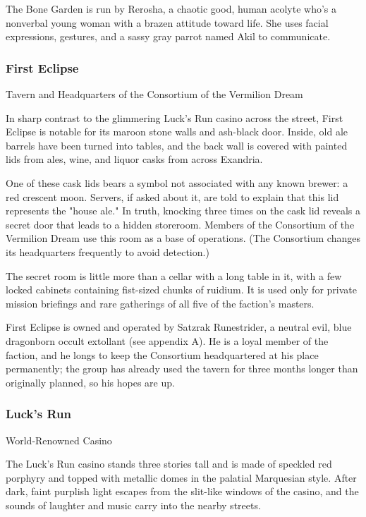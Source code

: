 \documentclass[10pt,a4paper,twoside,twocolumn,openany,nodeprecatedcode]{dndbook}
\begin{document}
The Bone Garden is run by Rerosha, a chaotic good, human acolyte who's a nonverbal young woman with a brazen attitude toward life. She uses facial expressions, gestures, and a sassy gray parrot named Akil to communicate.

\subsubsection{First Eclipse}
Tavern and Headquarters of the Consortium of the Vermilion Dream

In sharp contrast to the glimmering Luck's Run casino across the street, First Eclipse is notable for its maroon stone walls and ash-black door. Inside, old ale barrels have been turned into tables, and the back wall is covered with painted lids from ales, wine, and liquor casks from across Exandria.

One of these cask lids bears a symbol not associated with any known brewer: a red crescent moon. Servers, if asked about it, are told to explain that this lid represents the "house ale." In truth, knocking three times on the cask lid reveals a secret door that leads to a hidden storeroom. Members of the Consortium of the Vermilion Dream use this room as a base of operations. (The Consortium changes its headquarters frequently to avoid detection.)

The secret room is little more than a cellar with a long table in it, with a few locked cabinets containing fist-sized chunks of ruidium. It is used only for private mission briefings and rare gatherings of all five of the faction's masters.

First Eclipse is owned and operated by Satzrak Runestrider, a neutral evil, blue dragonborn occult extollant (see appendix A). He is a loyal member of the faction, and he longs to keep the Consortium headquartered at his place permanently; the group has already used the tavern for three months longer than originally planned, so his hopes are up.

\subsubsection{Luck's Run}
World-Renowned Casino

The Luck's Run casino stands three stories tall and is made of speckled red porphyry and topped with metallic domes in the palatial Marquesian style. After dark, faint purplish light escapes from the slit-like windows of the casino, and the sounds of laughter and music carry into the nearby streets.
\end{document}
